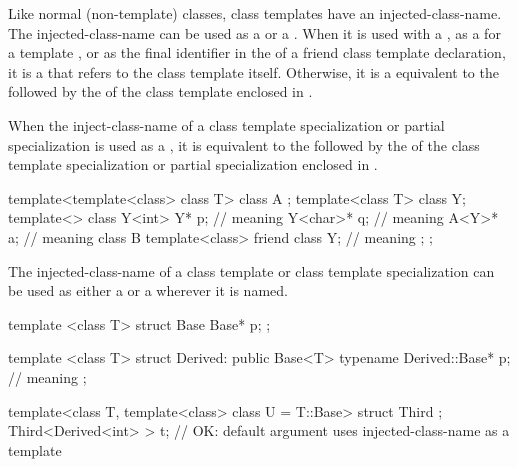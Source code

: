 \pnum
Like normal (non-template) classes, class templates have an
injected-class-name.
The
injected-class-name can be used
as a  or a .
When it is used with a
,
as a  for a template ,
or as the final identifier in the  of
a friend class template declaration,
it is a  that refers to the
class template itself.
Otherwise, it is a 
equivalent to the 
followed by the  of the class template
enclosed in \tcode{<>}.

\pnum
When the inject-class-name of a class template specialization or
partial specialization is used as a ,
it is equivalent to the  followed by the
of the class template specialization or partial
specialization enclosed in
\tcode{<>}.
\begin{example}
\begin{codeblock}
template<template<class> class T> class A { };
template<class T> class Y;
template<> class Y<int> {
  Y* p;                                 // meaning 
  Y<char>* q;                           // meaning 
  A<Y>* a;                              // meaning 
  class B {
    template<class> friend class Y;     // meaning 
  };
};
\end{codeblock}
\end{example}

\pnum
The injected-class-name of a class template or class
template specialization can be used as either
a  or a 
wherever it is named.
\begin{example}
\begin{codeblock}
template <class T> struct Base {
  Base* p;
};

template <class T> struct Derived: public Base<T> {
  typename Derived::Base* p;            // meaning 
};

template<class T, template<class> class U = T::Base> struct Third { };
Third<Derived<int> > t;                 // OK: default argument uses injected-class-name as a template
\end{codeblock}
\end{example}

